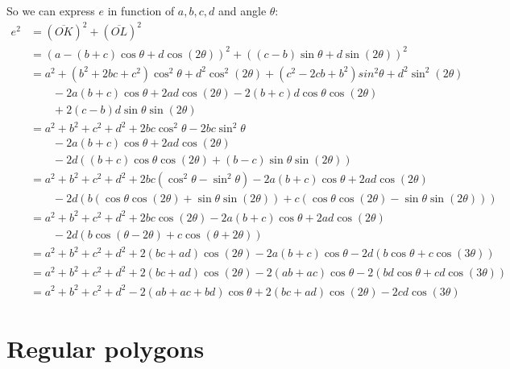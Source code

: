 \documentclass[11pt]{article}
\begin{document}
So we can express $e$ in function of $a,b,c,d$ and angle $\theta$:
\begin{align}
e^2 &= (\overline{OK})^2 + (\overline{OL})^2 \nonumber\\
 &= (a -(b+c)\cos\theta +d\cos(2\theta))^2 +((c-b)\sin\theta +d\sin(2\theta))^2 \nonumber\\
 &= a^2 +(b^2+2bc+c^2)\cos^2\theta + d^2\cos^2(2\theta) + (c^2-2cb+b^2)sin^2\theta +d^2\sin^2(2\theta) \nonumber\\
 &\qquad -2a(b+c)\cos\theta +2ad\cos(2\theta) -2(b+c)d\cos\theta\cos(2\theta) \nonumber\\
 &\qquad +2(c-b)d\sin\theta\sin(2\theta) \nonumber\\
%
 &= a^2 +b^2 +c^2 +d^2 +2bc\cos^2\theta -2bc\sin^2\theta \nonumber\\
 &\qquad -2a(b+c)\cos\theta +2ad\cos(2\theta) \nonumber\\
 &\qquad -2d((b+c)\cos\theta\cos(2\theta) + (b-c)\sin\theta\sin(2\theta)) \\
%
 &= a^2 +b^2 +c^2 +d^2 +2bc(\cos^2\theta -\sin^2\theta) 
  -2a(b+c)\cos\theta +2ad\cos(2\theta) \nonumber\\
 &\qquad -2d(b(\cos\theta\cos(2\theta)+\sin\theta\sin(2\theta)) 
  + c(\cos\theta\cos(2\theta)-\sin\theta\sin(2\theta))) \nonumber\\
%  
 &= a^2 +b^2 +c^2 +d^2 +2bc\cos(2\theta) 
  -2a(b+c)\cos\theta +2ad\cos(2\theta) \nonumber\\
 &\qquad -2d(b\cos(\theta-2\theta) + c\cos(\theta+2\theta)) \nonumber\\
% 
 &= a^2 +b^2 +c^2 +d^2 +2(bc+ad)\cos(2\theta) -2a(b+c)\cos\theta -2d(b\cos\theta + c\cos(3\theta)) \nonumber\\
% 
 &= a^2 +b^2 +c^2 +d^2 +2(bc+ad)\cos(2\theta) -2(ab+ac)\cos\theta -2(bd\cos\theta + cd\cos(3\theta)) \nonumber\\
%
 &= \boxed{ a^2 +b^2 +c^2 +d^2 -2(ab+ac+bd)\cos\theta +2(bc+ad)\cos(2\theta) -2cd\cos(3\theta) }
\end{align}

\section{Regular polygons}
\end{document}
